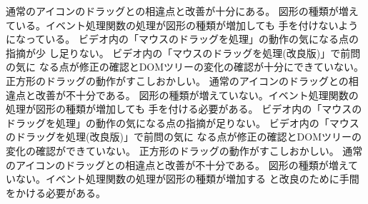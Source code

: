\documentclass[a4j]{jreport}
\begin{document}
{{{通常のアイコンのドラッグとの相違点と改善が十分にある。\ResultA}
{図形の種類が増えている。イベント処理関数の処理が図形の種類が増加しても
手を付けないようになっている。\ResultA}
 }
 {
 {\Must ビデオ内の「マウスのドラッグを処理」の動作の気になる点の指摘が少
 し足りない。\ResultFI}
{\Must ビデオ内の「マウスのドラッグを処理(改良版)」で前問の気に
なる点が修正の確認とDOMツリーの変化の確認が十分にできていない。\ResultA}
{\Must 正方形のドラッグの動作がすこしおかしい。}
{通常のアイコンのドラッグとの相違点と改善が不十分である。\ResultA}
{図形の種類が増えていない。イベント処理関数の処理が図形の種類が増加しても
手を付ける必要がある。\ResultA}
 }
 {
 {\Must ビデオ内の「マウスのドラッグを処理」の動作の気になる点の指摘が足りない。\ResultFI}
{\Must ビデオ内の「マウスのドラッグを処理(改良版)」で前問の気に
なる点が修正の確認とDOMツリーの変化の確認ができていない。\ResultA}
{\Must 正方形のドラッグの動作がすこしおかしい。}
{通常のアイコンのドラッグとの相違点と改善が不十分である。\ResultA}
{図形の種類が増えていない。イベント処理関数の処理が図形の種類が増加する
と改良のために手間をかける必要がある。\ResultA}
}
}
\end{document}
